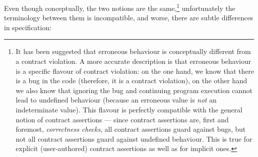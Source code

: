 Even though conceptually, the two notions are the same,\footnote{
It has been suggested that erroneous behaviour is conceptually different from a contract violation. A more accurate description is that erroneous behaviour is a specific flavour of contract violation: on the one hand, we know that there is a bug in the code (therefore, it is a contract violation), on the other hand we also know that ignoring the bug and continuing program execution cannot lead to undefined behaviour (because an erroneous value is \emph{not} an indeterminate value). This flavour is perfectly compatible with the general notion of contract assertions --- since contract assertions are, first and foremost, \emph{correctness checks}, all contract assertions guard against bugs, but not all contract assertions guard against undefined behaviour. This is true for explicit (user-authored) contract assertions as well as for implicit ones.} unfortunately the terminology between them is incompatible, and worse, there are subtle differences in specification:
